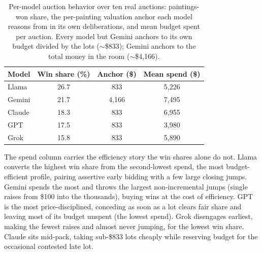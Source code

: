 \documentclass[conference]{IEEEtran}
\begin{document}
\begin{table}[htbp]
\caption{Per-model auction behavior over ten real auctions: paintings-won share, the per-painting valuation anchor each model reasons from in its own deliberations, and mean budget spent per auction. Every model but Gemini anchors to its own budget divided by the lots ($\sim$\$833); Gemini anchors to the total money in the room ($\sim$\$4{,}166).}
\label{tab:auction_behavior}
\centering
\begin{tabular}{lccc}
\hline
Model & Win share (\%) & Anchor (\$) & Mean spend (\$) \\
\hline
Llama & 26.7 & 833   & 5{,}226 \\
Gemini & 21.7 & 4{,}166 & 7{,}495 \\
Claude & 18.3 & 833   & 6{,}955 \\
GPT   & 17.5 & 833   & 3{,}980 \\
Grok  & 15.8 & 833   & 5{,}890 \\
\hline
\end{tabular}
\end{table}

The spend column carries the efficiency story the win shares alone do not. Llama converts the highest win share from the second-lowest spend, the most budget-efficient profile, pairing assertive early bidding with a few large closing jumps. Gemini spends the most and throws the largest non-incremental jumps (single raises from \$100 into the thousands), buying wins at the cost of efficiency. GPT is the most price-disciplined, conceding as soon as a lot clears fair share and leaving most of its budget unspent (the lowest spend). Grok disengages earliest, making the fewest raises and almost never jumping, for the lowest win share. Claude sits mid-pack, taking sub-\$833 lots cheaply while reserving budget for the occasional contested late lot.
\end{document}
